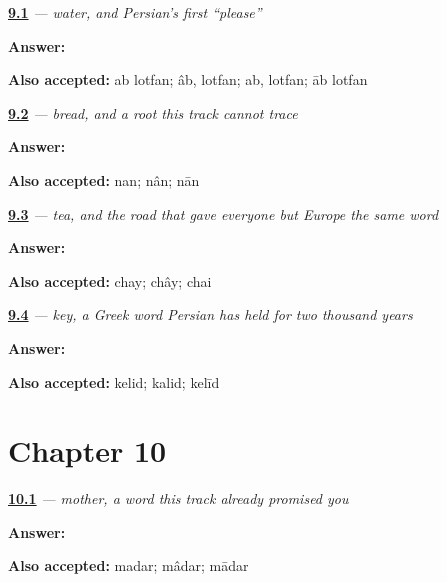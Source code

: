 \noindent\begin{minipage}[t]{\linewidth}
\raggedright
\hyperlink{review-FA-C09-ab-request}{\textbf{9.1}} \emph{ — water, and Persian's first \textquotedblleft{}please\textquotedblright{}}\par
\small \textbf{Answer:}  \par
\footnotesize \textbf{Also accepted:} ab lotfan; âb, lotfan; ab, lotfan; āb lotfan
\end{minipage}\par\medskip

\noindent\begin{minipage}[t]{\linewidth}
\raggedright
\hyperlink{review-FA-C09-nan-request}{\textbf{9.2}} \emph{ — bread, and a root this track cannot trace}\par
\small \textbf{Answer:} \par
\footnotesize \textbf{Also accepted:} nan; nân; nān
\end{minipage}\par\medskip

\noindent\begin{minipage}[t]{\linewidth}
\raggedright
\hyperlink{review-FA-C09-chay-request}{\textbf{9.3}} \emph{ — tea, and the road that gave everyone but Europe the same word}\par
\small \textbf{Answer:} \par
\footnotesize \textbf{Also accepted:} chay; chây; chai
\end{minipage}\par\medskip

\noindent\begin{minipage}[t]{\linewidth}
\raggedright
\hyperlink{review-FA-C09-kelid-request}{\textbf{9.4}} \emph{ — key, a Greek word Persian has held for two thousand years}\par
\small \textbf{Answer:} \par
\footnotesize \textbf{Also accepted:} kelid; kalid; kelīd
\end{minipage}\par\medskip

\section*{Chapter 10}

\noindent\begin{minipage}[t]{\linewidth}
\raggedright
\hyperlink{review-FA-C10-madar-meaning}{\textbf{10.1}} \emph{ — mother, a word this track already promised you}\par
\small \textbf{Answer:} \par
\footnotesize \textbf{Also accepted:} madar; mâdar; mādar
\end{minipage}\par\medskip

